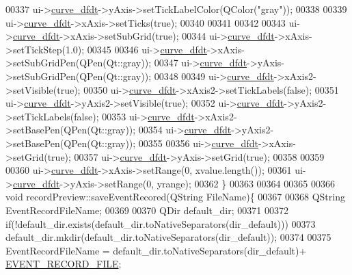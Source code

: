 \begin{DoxyCode}
00337   ui->\hyperlink{a00028_a43d24fa14d90cc27b310542e39dcdd1b}{curve\_dfdt}->yAxis->setTickLabelColor(QColor(\textcolor{stringliteral}{"gray"}));
00338 
00339   ui->\hyperlink{a00028_a43d24fa14d90cc27b310542e39dcdd1b}{curve\_dfdt}->xAxis->setTicks(\textcolor{keyword}{true});
00340 
00341 
00342 
00343   ui->\hyperlink{a00028_a43d24fa14d90cc27b310542e39dcdd1b}{curve\_dfdt}->xAxis->setSubGrid(\textcolor{keyword}{true});
00344   ui->\hyperlink{a00028_a43d24fa14d90cc27b310542e39dcdd1b}{curve\_dfdt}->xAxis->setTickStep(1.0);
00345 
00346   ui->\hyperlink{a00028_a43d24fa14d90cc27b310542e39dcdd1b}{curve\_dfdt}->xAxis->setSubGridPen(QPen(Qt::gray));
00347   ui->\hyperlink{a00028_a43d24fa14d90cc27b310542e39dcdd1b}{curve\_dfdt}->yAxis->setSubGridPen(QPen(Qt::gray));
00348 
00349   ui->\hyperlink{a00028_a43d24fa14d90cc27b310542e39dcdd1b}{curve\_dfdt}->xAxis2->setVisible(\textcolor{keyword}{true});
00350   ui->\hyperlink{a00028_a43d24fa14d90cc27b310542e39dcdd1b}{curve\_dfdt}->xAxis2->setTickLabels(\textcolor{keyword}{false});
00351   ui->\hyperlink{a00028_a43d24fa14d90cc27b310542e39dcdd1b}{curve\_dfdt}->yAxis2->setVisible(\textcolor{keyword}{true});
00352   ui->\hyperlink{a00028_a43d24fa14d90cc27b310542e39dcdd1b}{curve\_dfdt}->yAxis2->setTickLabels(\textcolor{keyword}{false});
00353   ui->\hyperlink{a00028_a43d24fa14d90cc27b310542e39dcdd1b}{curve\_dfdt}->xAxis2->setBasePen(QPen(Qt::gray));
00354   ui->\hyperlink{a00028_a43d24fa14d90cc27b310542e39dcdd1b}{curve\_dfdt}->yAxis2->setBasePen(QPen(Qt::gray));
00355 
00356    ui->\hyperlink{a00028_a43d24fa14d90cc27b310542e39dcdd1b}{curve\_dfdt}->xAxis->setGrid(\textcolor{keyword}{true});
00357    ui->\hyperlink{a00028_a43d24fa14d90cc27b310542e39dcdd1b}{curve\_dfdt}->yAxis->setGrid(\textcolor{keyword}{true});
00358 
00359 
00360   ui->\hyperlink{a00028_a43d24fa14d90cc27b310542e39dcdd1b}{curve\_dfdt}->xAxis->setRange(0, xvalue.length());
00361   ui->\hyperlink{a00028_a43d24fa14d90cc27b310542e39dcdd1b}{curve\_dfdt}->yAxis->setRange(0, yrange);
00362 \}
00363 
00364 
00365 
00366 \textcolor{keywordtype}{void} recordPreview::saveEventRecored(QString FileName)\{
00367 
00368     QString EventRecordFileName;
00369 
00370             QDir default\_dir;
00371 
00372             \textcolor{keywordflow}{if}(!default\_dir.exists(default\_dir.toNativeSeparators(dir\_default)))
00373                 default\_dir.mkdir(default\_dir.toNativeSeparators(dir\_default));
00374 
00375             EventRecordFileName = default\_dir.toNativeSeparators(dir\_default)+ 
      \hyperlink{a00039_a8d4ad2cd60e024f6e0f37dbac40768a1}{EVENT\_RECORD\_FILE};

\end{DoxyCode}
